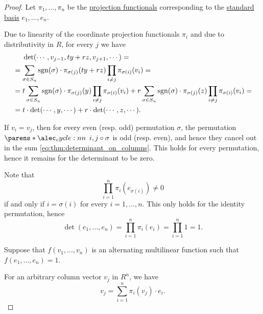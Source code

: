 \begin{proof}
  Let \( \pi_1, \ldots, \pi_n \) be the \hyperref[def:basis_decomposition]{projection functionals} corresponding to the \hyperref[def:standard_basis]{standard basis} \( e_1, \ldots, e_n \).

   Due to linearity of the coordinate projection functionals \( \pi_i \) and due to distributivity in \( R \), for every \( j \) we have
  \begin{align*}
    &\phantom{{}={}}
    \det(\cdots, v_{j-1}, ty + rz, v_{j+1}, \cdots)
    = \\ &=
    \sum_{\sigma \in S_n} \sgn(\sigma) \cdot \pi_{\sigma(j)} (ty + rz) \prod_{i \neq j} \pi_{\sigma(i)} (v_i)
    = \\ &=
    t \sum_{\sigma \in S_n} \sgn(\sigma) \cdot \pi_{\sigma(j)} (y) \prod_{i \neq j} \pi_{\sigma(i)} (v_i) + r \sum_{\sigma \in S_n} \sgn(\sigma) \cdot \pi_{\sigma(j)} (z) \prod_{i \neq j} \pi_{\sigma(i)} (v_i)
    = \\ &=
    t \cdot \det(\cdots, y, \cdots) + r \cdot \det(\cdots, z, \cdots).
  \end{align*}

   If \( v_i = v_j \), then for every even (resp. odd) permutation \( \sigma \), the permutation \( \cycle{i, j} \bincirc \sigma \) is odd (resp. even), and hence they cancel out in the sum \eqref{eq:thm:determinant_on_columns}. This holds for every permutation, hence it remains for the determinant to be zero.

   Note that
  \begin{equation*}
    \prod_{i=1}^n \pi_i (e_{\sigma(i)}) \neq 0
  \end{equation*}
  if and only if \( i = \sigma(i) \) for every \( i = 1, \ldots, n \). This only holds for the identity permutation, hence
  \begin{equation*}
    \det(e_1, \ldots, e_n) = \prod_{i=1}^n \pi_i(e_i) = \prod_{i=1}^n 1 = 1.
  \end{equation*}

   Suppose that \( f(v_1, \ldots, v_n) \) is an alternating multilinear function such that \( f(e_1, \ldots, e_n) = 1 \).

  For an arbitrary column vector \( v_j \) in \( R^n \), we have
  \begin{equation*}
    v_j = \sum_{i=1}^n \pi_i(v_j) \cdot e_i.
  \end{equation*}


\end{proof}
